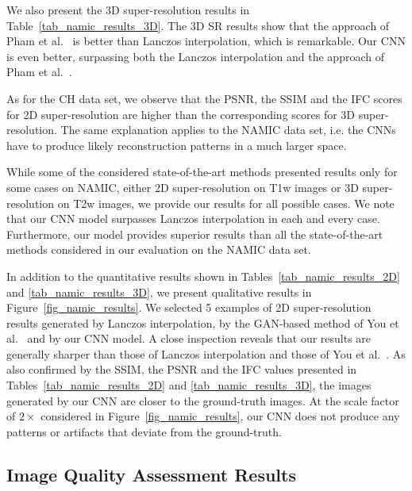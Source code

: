 \documentclass{ieeeaccess}
\begin{document}
We also present the 3D super-resolution results in Table~\ref{tab_namic_results_3D}. The 3D SR results show that the approach of Pham et al.~\cite{Pham-CMIG-2019} is better than Lanczos interpolation, which is remarkable. Our CNN is even better, surpassing both the Lanczos interpolation and the approach of Pham et al.~\cite{Pham-CMIG-2019}.

As for the CH data set, we observe that the PSNR, the SSIM and the IFC scores for 2D super-resolution are higher than the corresponding scores for 3D super-resolution. The same explanation applies to the NAMIC data set, i.e. the CNNs have to produce likely reconstruction patterns in a much larger space.

While some of the considered state-of-the-art methods \cite{Du-AS-2019,Pham-CMIG-2019,ZENG-CBM-2018} presented results only for some cases on NAMIC, either 2D super-resolution on T1w images or 3D super-resolution on T2w images, we provide our results for all possible cases. We note that our CNN model surpasses Lanczos interpolation in each and every case. Furthermore, our model provides superior results than all the state-of-the-art methods \cite{Du-AS-2019,Pham-CMIG-2019,You-TMI-2019,ZENG-CBM-2018} considered in our evaluation on the NAMIC data set.

In addition to the quantitative results shown in Tables~\ref{tab_namic_results_2D} and \ref{tab_namic_results_3D}, we present qualitative results in Figure~\ref{fig_namic_results}. We selected 5 examples of 2D super-resolution results generated by Lanczos interpolation, by the GAN-based method of You et al.~\cite{You-TMI-2019} and by our CNN model. A close inspection reveals that our results are generally sharper than those of Lanczos interpolation and those of You et al.~\cite{You-TMI-2019}. As also confirmed by the SSIM, the PSNR and the IFC values presented in Tables~\ref{tab_namic_results_2D} and \ref{tab_namic_results_3D}, the images generated by our CNN are closer to the ground-truth images. At the scale factor of $2\times$ considered in Figure~\ref{fig_namic_results}, our CNN does not produce any patterns or artifacts that deviate from the ground-truth.

\subsection{Image Quality Assessment Results}
\end{document}
